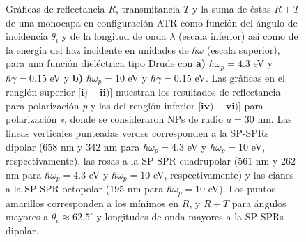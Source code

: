 \begin{figure}[h!]
\begin{subfigure}{.7\linewidth}
		\end{subfigure}\vspace*{-.5em}
	\caption{Gráficas de reflectancia $R$, transmitancia $T$ y la suma de éstas $R+T$ de una monocapa en configuración ATR como función del ángulo de incidencia $\theta_i$ y de la longitud de onda $\lambda$ (escala inferior) así como de la energía del haz incidente en unidades de $\hbar\omega$ (escala superior), para una función dieléctrica tipo Drude con \textbf{a)} $\hbar\omega_p=4. 3$ eV  y  $\hbar\gamma=0. 15$ eV y \textbf{b)} $\hbar\omega_p = 10$ eV y $\hbar\gamma = 0.15$ eV.  Las gráficas   en el renglón superior [$\mathbf{i)-ii)}$]  muestran los resultados de reflectancia para  polarización \emph{p} y las del renglón inferior  [$\mathbf{iv)-vi)}$] para polarización  \emph{s}, donde se consideraron NPs de radio $a=30$ nm. Las líneas verticales punteadas verdes corresponden a la SP-SPRs dipolar ($658$ nm y $342$ nm para $\hbar\omega_p=4.3$ eV y $\hbar\omega_p = 10$ eV, respectivamente), las rosas a la SP-SPR cuadrupolar ($561$ nm y $262$ nm para $\hbar\omega_p=4.3$ eV y $\hbar\omega_p = 10$ eV, respectivamente) y las cianes a la SP-SPR octopolar ($195$ nm para $\hbar\omega_p = 10$ eV). Los puntos amarillos corresponden a los mínimos en $R$, y $R+T$ para ángulos mayores a $\theta_c\approx 62.5^\circ$ y longitudes de onda mayores a la SP-SPRs dipolar. }\label{fig:RT-Omegas}
	\end{figure}	

